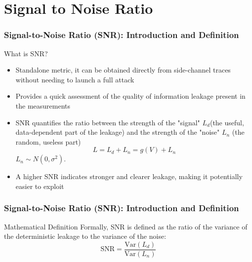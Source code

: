 \section{Signal to Noise Ratio}

\begin{frame}
    \frametitle{Signal-to-Noise Ratio (SNR): Introduction and Definition}
    \begin{block}{What is SNR?}
        \begin{itemize}
            \item Standalone metric, it can be obtained directly from side-channel traces without needing to launch a full attack
            \item Provides a quick assessment of the quality of information leakage present in the measurements
        \end{itemize}
    \end{block}

    \begin{block}{}
        \begin{itemize}
            \item SNR quantifies the ratio between the strength of the "signal" $L_d$(the useful, data-dependent part of the leakage) and the strength of the "noise" $L_n$ (the random, useless part) \newline \newline
                    $$L=L_d+L_n=g(V)+L_n$$  $L_n \sim N (0, \sigma^2 )$.

            \item A higher SNR indicates stronger and clearer leakage, making it potentially easier to exploit
        \end{itemize}
    \end{block}
\end{frame}
\begin{frame}
    \frametitle{Signal-to-Noise Ratio (SNR): Introduction and Definition}
    \begin{block}{Mathematical Definition}
            Formally, SNR is defined as the ratio of the variance of the deterministic leakage to the variance of the noise:
            $$ \text{SNR} = \frac{\text{Var}(L_d)}{\text{Var}(L_n)} $$
    \end{block}
\end{frame}

